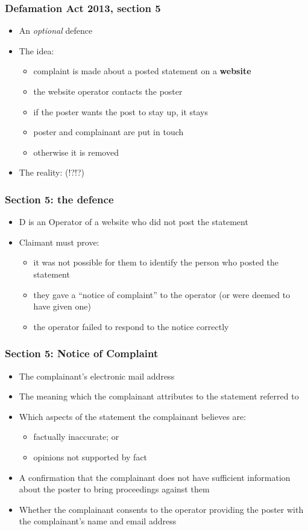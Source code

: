 \documentclass[ignorenonframetext,]{beamer}
\begin{document}
\begin{frame}
  \frametitle{Defamation Act 2013, section 5}
  \begin{itemize}
  \item An {\it optional} defence
  \item The idea:
    \begin{itemize}
    \item complaint is made about a posted statement on a {\bf website}
    \item the website operator contacts the poster
    \item if the poster wants the post to stay up, it stays
    \item poster and complainant are put in touch
    \item otherwise it is removed
    \end{itemize}
  \item The reality: (!?!?)
  \end{itemize}
\end{frame}

\begin{frame}
  \frametitle{Section 5: the defence}
  \begin{itemize}
  \item D is an Operator of a website who did not post the statement
  \item Claimant must prove:
    \begin{itemize}
    \item it was not possible for them to identify the person who posted the statement
    \item they gave a ``notice of complaint'' to the operator (or were deemed to have given one)
    \item the operator failed to respond to the notice correctly
    \end{itemize}
  \end{itemize}
\end{frame}

\begin{frame}
  \frametitle{Section 5: Notice of Complaint}

  \begin{itemize}
  \item The complainant's electronic mail address
  \item The meaning which the complainant attributes to the statement referred to
  \item Which aspects of the statement the complainant believes are:
    \begin{itemize}
    \item factually inaccurate; or
    \item opinions not supported by fact
    \end{itemize}
  \item A confirmation that the complainant does not have sufficient information about the poster to bring proceedings against them
  \item Whether the complainant consents to the operator providing the poster with the complainant's name and email address
\end{itemize}

\end{frame}
\end{document}
